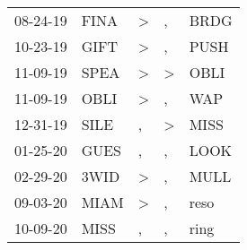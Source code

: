 \begin{supertabular}{lllll}
 08-24-19 &   FINA &     \textgreater &                , &   BRDG \\
 10-23-19 &   GIFT &     \textgreater &                , &   PUSH \\
 11-09-19 &   SPEA &     \textgreater &     \textgreater &   OBLI \\
 11-09-19 &   OBLI &     \textgreater &                , &    WAP \\
 12-31-19 &   SILE &                , &     \textgreater &   MISS \\
 01-25-20 &   GUES &                , &                , &   LOOK \\
 02-29-20 &   3WID &     \textgreater &                , &   MULL \\
 09-03-20 &   MIAM &     \textgreater &                , &   reso \\
 10-09-20 &   MISS &                , &                , &   ring \\
\end{supertabular}
